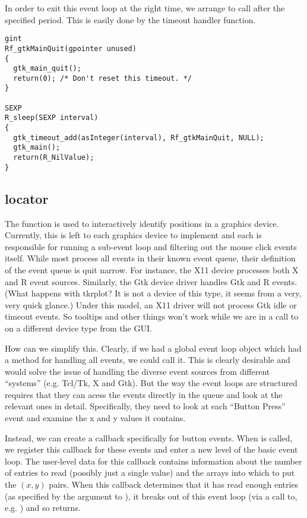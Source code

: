 \documentclass{article}
\begin{document}
In order to exit this event loop at the right time, we arrange to call
 after the specified period.
This is easily done by the timeout handler function.
\begin{verbatim}
gint
Rf_gtkMainQuit(gpointer unused)
{
  gtk_main_quit();
  return(0); /* Don't reset this timeout. */
}

SEXP
R_sleep(SEXP interval)
{
  gtk_timeout_add(asInteger(interval), Rf_gtkMainQuit, NULL);
  gtk_main();
  return(R_NilValue);  
}
\end{verbatim}

\subsection{locator}
The function  is used to interactively identify
positions in a graphics device.  Currently, this is left to each
graphics device to implement and each is responsible for running a
sub-event loop and filtering out the mouse click events itself.  While
most process all events in their known event queue, their definition
of the event queue is quit narrow.  For instance, the X11 device
processes both X and R event sources.  Similarly, the Gtk device
driver handles Gtk and R events.  (What happens with tkrplot? It is
not a device of this type, it seems from a very, very quick glance.)
Under this model, an X11 driver will not process Gtk idle or timeout
events. So tooltips and other things won't work while we are in a call
to  on a different device type from the GUI.

How can we simplify this.  Clearly, if we had a global event loop
object which had a method for handling all events, we could call it.
This is clearly desirable and would solve the issue of handling the
diverse event sources from different ``systems'' (e.g. Tcl/Tk, X and
Gtk). But the way the  event loops are structured
requires that they can acess the events directly in the queue and look
at the relevant ones in detail. Specifically, they need to look at
each ``Button Press'' event and examine the x and y values it
contains.

Instead, we can create a callback specifically for button events.
When  is called, we register this callback for
these events and enter a new level of the basic event loop.  The
user-level data for this callback contains information about the
number of entries to read (possibly just a single value) and the
arrays into which to put the $(x,y)$ pairs.  When this callback
determines that it has read enough entries (as specified by the
 argument to ), it breaks out of this event
loop (via a call to, e.g. ) and so
 returns.
\end{document}
